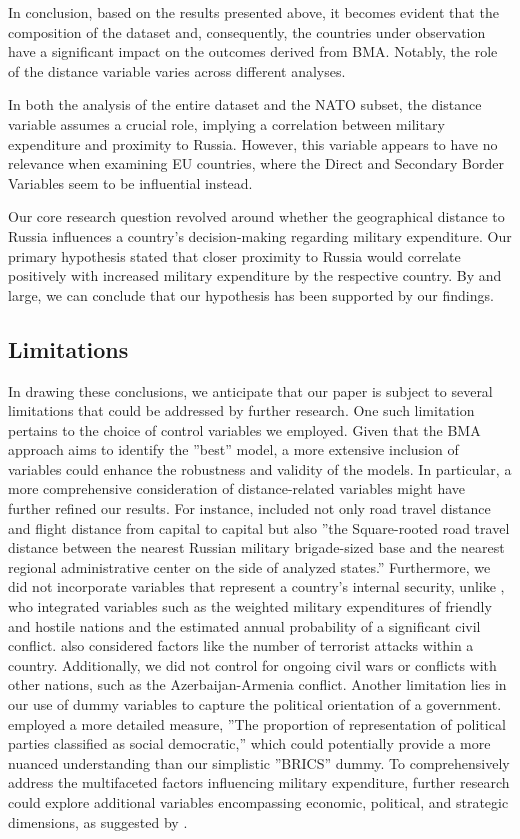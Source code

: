 \documentclass[12pt,a4paper]{article}
\begin{document}
In conclusion, based on the results presented above, it becomes evident that the composition of the dataset and, consequently, the countries under observation have a significant impact on the outcomes derived from BMA. Notably, the role of the distance variable varies across different analyses. 

In both the analysis of the entire dataset and the NATO subset, the distance variable assumes a crucial role, implying a correlation between military expenditure and proximity to Russia. However, this variable appears to have no relevance when examining EU countries, where the Direct and Secondary Border Variables seem to be influential instead.

Our core research question revolved around whether the geographical distance to Russia influences a country's decision-making regarding military expenditure. Our primary hypothesis stated that closer proximity to Russia would correlate positively with increased military expenditure by the respective country. By and large, we can conclude that our hypothesis has been supported by our findings. \\

\subsection{Limitations}
In drawing these conclusions, we anticipate that our paper is subject to several limitations that could be addressed by further research. One such limitation pertains to the choice of control variables we employed. Given that the BMA approach aims to identify the ''best'' model, a more extensive inclusion of variables could enhance the robustness and validity of the models. In particular, a more comprehensive consideration of distance-related variables might have further refined our results. For instance, \citet{kofrovn2023} included not only road travel distance and flight distance from capital to capital but also ''the Square-rooted road travel distance between the nearest Russian military brigade-sized base and the nearest regional administrative center on the side of analyzed states.'' Furthermore, we did not incorporate variables that represent a country's internal security, unlike \citet{nordhaus2012}, who integrated variables such as the weighted military expenditures of friendly and hostile nations and the estimated annual probability of a significant civil conflict. \citet{kofrovn2023} also considered factors like the number of terrorist attacks within a country. Additionally, we did not control for ongoing civil wars or conflicts with other nations, such as the Azerbaijan-Armenia conflict. Another limitation lies in our use of dummy variables to capture the political orientation of a government. \citet{kofrovn2023} employed a more detailed measure, ''The proportion of representation of political parties classified as social democratic,'' which could potentially provide a more nuanced understanding than our simplistic ''BRICS'' dummy. To comprehensively address the multifaceted factors influencing military expenditure, further research could explore additional variables encompassing economic, political, and strategic dimensions, as suggested by \citet{nikolaidou2008}.
\end{document}
